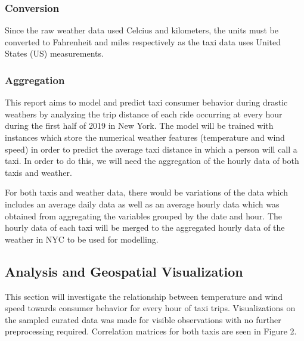 \documentclass[11pt]{article}
\begin{document}
\subsubsection{Conversion}
Since the raw weather data used Celcius and kilometers, the units must be converted to Fahrenheit and miles respectively as the taxi data uses United States (US) measurements.

\subsubsection{Aggregation}
This report aims to model and predict taxi consumer behavior during drastic weathers by analyzing the trip distance of each ride occurring at every hour during the first half of 2019 in New York. The model will be trained with instances which store the numerical weather features (temperature and wind speed) in order to predict the average taxi distance in which a person will call a taxi. In order to do this, we will need the aggregation of the hourly data of both taxis and weather.

For both taxis and weather data, there would be variations of the data which includes an average daily data as well as an average hourly data which was obtained from aggregating the variables grouped by the date and hour. The hourly data of each taxi will be merged to the aggregated hourly data of the weather in NYC to be used for modelling.

\subsection{Analysis and Geospatial Visualization}
This section will investigate the relationship between temperature and wind speed towards consumer behavior for every hour of taxi trips. Visualizations on the sampled curated data was made for visible observations with no further preprocessing required. Correlation matrices for both taxis are seen in Figure 2.
\end{document}
